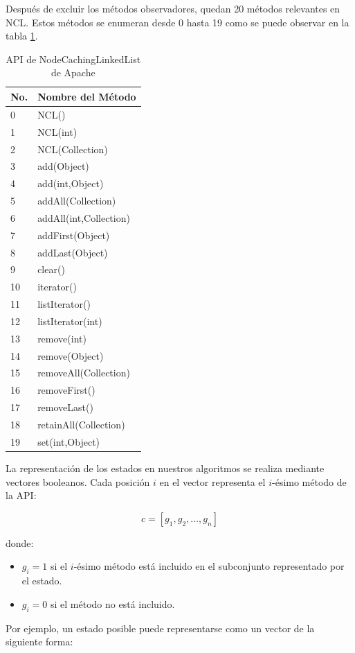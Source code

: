Después de excluir los métodos observadores, quedan 20 métodos relevantes en NCL. Estos métodos se enumeran desde 0 hasta 19 como se puede observar en la tabla \ref{tab:ncl-api-infer}. 
\begin{table}[h!]
\centering
{\scriptsize
\begin{tabular}{|l|l|}
\hline
No. & Nombre del Método \\
\hline
0 & NCL() \\
1 & NCL(int) \\
2 & NCL(Collection) \\
3 & add(Object) \\
4 & add(int,Object) \\
5 & addAll(Collection) \\
6 & addAll(int,Collection) \\
7 & addFirst(Object) \\
8 & addLast(Object) \\
9 & clear() \\
10 & iterator() \\
11 & listIterator() \\
12 & listIterator(int) \\
13 & remove(int) \\
14 & remove(Object) \\
15 & removeAll(Collection) \\
16 & removeFirst() \\
17 & removeLast() \\
18 & retainAll(Collection) \\
19 & set(int,Object) \\
\hline
\end{tabular}
}
\caption{API de NodeCachingLinkedList de Apache}
\label{tab:ncl-api-infer}
\end{table}

La representación de los estados en nuestros algoritmos se realiza mediante vectores booleanos. Cada posición $i$ en el vector representa el $i$-ésimo método de la API:

\[
c = [g_1, g_2, \ldots, g_n]
\]

donde:
\begin{itemize}
    \item $g_i = 1$ si el $i$-ésimo método está incluido en el subconjunto representado por el estado.
    \item $g_i = 0$ si el método no está incluido.
\end{itemize}

Por ejemplo, un estado posible puede representarse como un vector de la siguiente forma:


